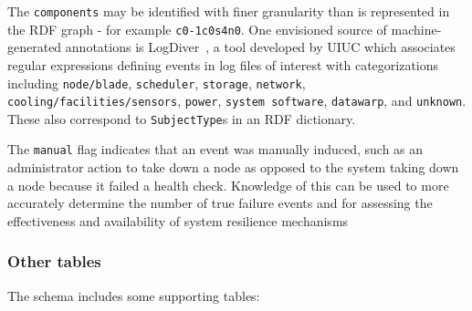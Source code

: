 The \texttt{components} may be identified with finer granularity than
is represented in the RDF graph - for example \texttt{c0-1c0s4n0}. One 
envisioned source of machine-generated annotations is LogDiver~\cite{LogDiver}, 
a tool developed by UIUC which associates regular expressions defining
events in log files of interest with categorizations including 
\texttt{node/blade},
\texttt{scheduler}, \texttt{storage}, \texttt{network}, \texttt{cooling/facilities/sensors},
\texttt{power}, \texttt{system software}, \texttt{datawarp}, and \texttt{unknown}.
These also correspond to \texttt{SubjectType}s in an RDF dictionary.

The \texttt{manual} flag indicates that an event was manually induced,
such as an administrator action to take down a node as opposed
to the system taking down a node because it failed a health check.
Knowledge of this can be used to more accurately determine the
number of true failure events and for assessing the effectiveness
and availability of system resilience mechanisms




\subsubsection{Other tables}

The schema includes some supporting tables:

